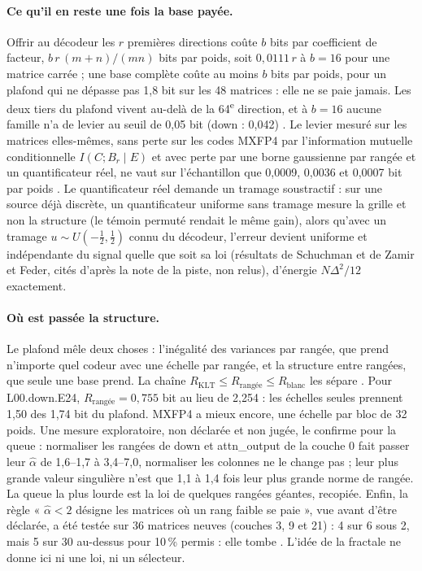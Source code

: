 \paragraph{Ce qu'il en reste une fois la base payée.} Offrir au décodeur les $r$ premières directions coûte $b$ bits par coefficient de facteur, $b\,r\,(m + n)/(mn)$ bits par poids, soit $0{,}0111\,r$ à $b = 16$ pour une matrice carrée \calc ; une base complète coûte au moins $b$ bits par poids, pour un plafond qui ne dépasse pas 1,8 bit sur les 48 matrices : elle ne se paie jamais. Les deux tiers du plafond vivent au-delà de la 64\textsuperscript{e} direction, et à $b = 16$ aucune famille n'a de levier au seuil de 0,05 bit (down : 0,042) . Le levier mesuré sur les matrices elles-mêmes, sans perte sur les codes MXFP4 par l'information mutuelle conditionnelle $I(C ; B_r \mid E)$ et avec perte par une borne gaussienne par rangée et un quantificateur réel, ne vaut sur l'échantillon que 0,0009, 0,0036 et 0,0007 bit par poids . Le quantificateur réel demande un tramage soustractif : sur une source déjà discrète, un quantificateur uniforme sans tramage mesure la grille et non la structure (le témoin permuté rendait le même gain), alors qu'avec un tramage $u \sim U(-\tfrac12, \tfrac12)$ connu du décodeur, l'erreur devient uniforme et indépendante du signal quelle que soit sa loi (résultats de Schuchman et de Zamir et Feder, cités d'après la note de la piste, non relus), d'énergie $N\Delta^2/12$ exactement.

\paragraph{Où est passée la structure.} Le plafond mêle deux choses : l'inégalité des variances par rangée, que prend n'importe quel codeur avec une échelle par rangée, et la structure entre rangées, que seule une base prend. La chaîne $R_{\mathrm{KLT}} \le R_{\text{rangée}} \le R_{\text{blanc}}$ les sépare \calc. Pour L00.down.E24, $R_{\text{rangée}} = 0{,}755$ bit au lieu de 2,254 : les échelles seules prennent 1,50 des 1,74 bit du plafond. MXFP4 a mieux encore, une échelle par bloc de 32 poids. Une mesure exploratoire, non déclarée et non jugée, le confirme pour la queue : normaliser les rangées de down et attn\_output de la couche 0 fait passer leur $\hat\alpha$ de 1,6--1,7 à 3,4--7,0, normaliser les colonnes ne le change pas ; leur plus grande valeur singulière n'est que 1,1 à 1,4 fois leur plus grande norme de rangée. La queue la plus lourde est la loi de quelques rangées géantes, recopiée. Enfin, la règle « $\hat\alpha < 2$ désigne les matrices où un rang faible se paie », vue avant d'être déclarée, a été testée sur 36 matrices neuves (couches 3, 9 et 21) : 4 sur 6 sous 2, mais 5 sur 30 au-dessus pour 10\,\% permis : elle tombe . L'idée de la fractale ne donne ici ni une loi, ni un sélecteur.

